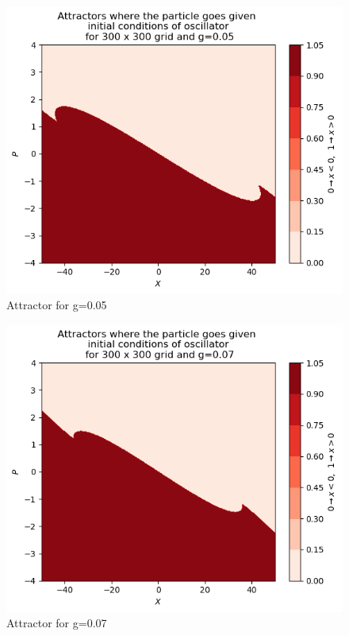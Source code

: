 \documentclass[idxtotoc,hyperref,openany]{labbook} %
\begin{document}
\begin{figure}[H] %
\begin{center}
\includegraphics[width=1\linewidth]{attractor009.png}
\end{center}
\caption{Attractor for g=0.05}
\label{Attractorg0-05}
\end{figure}

\begin{figure}[H] %
\begin{center}
\includegraphics[width=1\linewidth]{attractor011.png}
\end{center}
\caption{Attractor for g=0.07}
\label{Attractorg0-07}
\end{figure}
\end{document}
